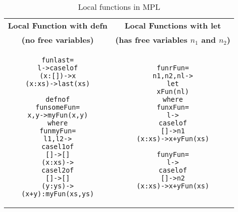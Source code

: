 \documentclass[11pt]{article}
\begin{document}
\begin{table}[h!]
\begin{center}
\begin{tabular}{|c|c|} \hline
{\bf Local Function with defn} & {\bf Local Functions with let} \\ 
{\bf (no free variables)} & {\bf (has free variables $n_1$ and $n_2$)} \\  
\hline
\begin{minipage}{3.2in}
\begin{alltt}

    fun last =
      l -> case l of 
       (x:[]) -> x 
       (x:xs) -> last(xs) 

    defn of
        fun someFun =
            x, y -> myFun (x,y)
    where
      fun myFun  = 
         l1,l2 ->
             case l1 of 
               []     -> []
               (x:xs) -> 
                    case l2 of 
                      [] -> []
                      (y:ys) -> 
                        (x+y):myFun (xs,ys)

\end{alltt} 
\end {minipage} &
\begin{minipage}{3in}
\begin{alltt}

fun rFun = 
    n1, n2, nl -> 
      let 
        xFun(nl)
      where
        fun xFun = 
          l ->
            case l of 
              []     -> n1 
              (x:xs) -> x + yFun (xs)    

        fun yFun = 
          l ->
            case l of 
              []     ->  n2 
              (x:xs) -> x + yFun (xs)



\end{alltt} 
\end {minipage}
\tabularnewline
\hline
\end{tabular}
\caption{Local functions in MPL }
\label{LoclFuns}
\end{center}
\end{table}
\end{document}
